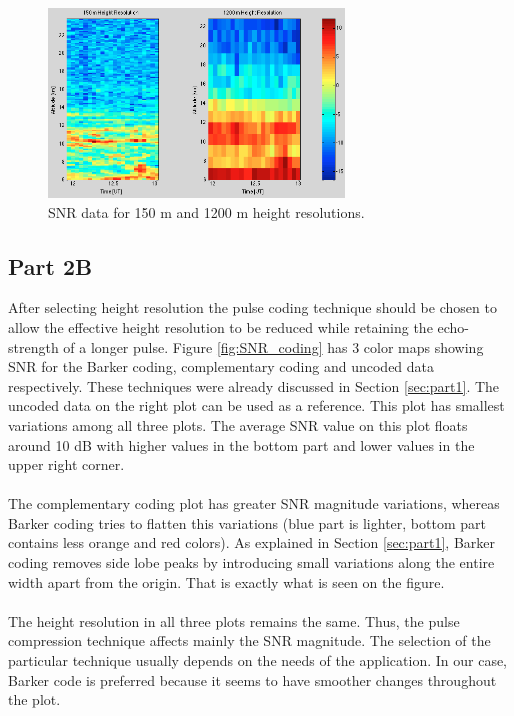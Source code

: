 \documentclass{article}
\begin{document}
\begin{figure}[bth]
\centering
\includegraphics[width=0.7\textwidth]{Figures/height_res.png}
\caption{SNR data for 150 m and 1200 m height resolutions.}
\label{fig:height_res}
\end{figure}


\subsection{Part 2B}

After selecting height resolution the pulse coding technique should be chosen to allow the effective height resolution to be reduced while retaining the echo-strength of a longer pulse. Figure \ref{fig:SNR_coding} has 3 color maps showing SNR for the Barker coding, complementary coding and uncoded data respectively. These techniques were already discussed in Section \ref{sec:part1}. The uncoded data on the right plot can be used as a reference. This plot has smallest variations among all three plots. The average SNR value on this plot floats around 10 dB with higher values in the bottom part and lower values in the upper right corner.\\
\\
The complementary coding plot has greater SNR magnitude variations, whereas Barker coding tries to flatten this variations (blue part is lighter, bottom part contains less orange and red colors). As explained in Section \ref{sec:part1}, Barker coding removes side lobe peaks by introducing small variations along the entire width apart from the origin. That is exactly what is seen on the figure.\\
\\
The height resolution in all three plots remains the same. Thus, the pulse compression technique affects mainly the SNR magnitude. The selection of the particular technique usually depends on the needs of the application. In our case, Barker code is preferred because it seems to have smoother changes throughout the plot.
\end{document}
